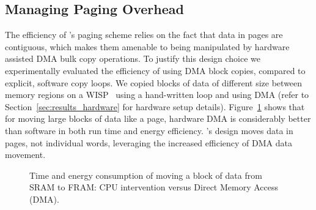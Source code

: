 \subsection{Managing Paging Overhead}

The efficiency of \sys's paging scheme relies on the fact that data in pages are contiguous, which makes them amenable to being manipulated by hardware assisted DMA bulk copy operations. To justify this design choice we experimentally evaluated the efficiency of using DMA block copies, compared to explicit, software copy loops. We copied blocks of data of different size between memory regions on a WISP~\cite{wisp} using a hand-written loop and using DMA (refer to Section~\ref{sec:results_hardware} for hardware setup details). Figure~\ref{fig:dmaTimeEnergy} shows that for moving large blocks of data like a page, hardware DMA is considerably better than software in both run time and energy efficiency. \sys's design moves data in pages, not individual words, leveraging the increased efficiency of DMA data movement.

\begin{figure}[t]
	\centering
	\caption{Time and energy consumption of moving a block of data from SRAM to FRAM: CPU intervention versus Direct Memory Access (DMA).}
	\label{fig:dmaTimeEnergy}
\end{figure}